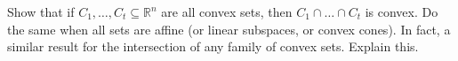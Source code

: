 \begin{exercise}
  Show that if $C_1, \dots, C_t \subseteq \mathbb{R}^n$ are all convex sets, then $C_1 \cap \dots \cap C_t$ is convex.
  Do the same when all sets are affine (or linear subspaces, or convex cones).
  In fact, a similar result for the intersection of any family of convex sets.
  Explain this.
\end{exercise}